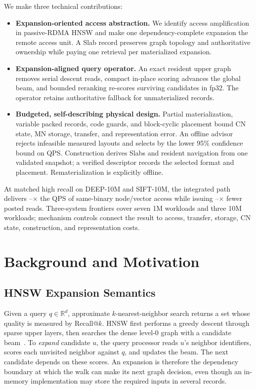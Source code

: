 \documentclass[sigconf,nonacm]{acmart}
\begin{document}
We make three technical contributions:
\begin{itemize}
  \item \textbf{Expansion-oriented access abstraction.}  We identify access
  amplification in passive-RDMA HNSW and make one dependency-complete expansion
  the remote access unit.  A Slab record preserves graph topology and
  authoritative ownership while paying one retrieval per materialized
  expansion.
  \item \textbf{Expansion-aligned query operator.}  An exact resident upper
  graph removes serial descent reads, compact in-place scoring advances the
  global beam, and bounded reranking re-scores surviving candidates in fp32.
  The operator retains authoritative fallback for unmaterialized records.
  \item \textbf{Budgeted, self-describing physical design.}  Partial materialization,
  variable packed records, code guards, and block-cyclic placement bound CN
  state, MN storage, transfer, and representation error.  An offline advisor
  rejects infeasible measured layouts and selects by the lower 95\% confidence
  bound on QPS.  Construction derives Slabs and resident navigation from one
  validated snapshot; a verified descriptor records the selected format and
  placement.  Rematerialization is explicitly offline.
\end{itemize}
At matched high recall on DEEP-10M and SIFT-10M, the integrated path delivers
\ClaimFrontierQpsMin--\ClaimFrontierQpsMax$\times$ the QPS of same-binary
node/vector access while issuing \ClaimFrontierPostsMin--\ClaimFrontierPostsMax$\times$
fewer posted reads.  Three-system frontiers cover seven 1M workloads and three
10M workloads; mechanism controls connect the result to access, transfer,
storage, CN state, construction, and representation costs.

\section{Background and Motivation}
\label{sec:diagnosis}

\subsection{HNSW Expansion Semantics}
\label{sec:bg-ann}

Given a query $q\in\mathbb{R}^d$, approximate $k$-nearest-neighbor search
returns a set whose quality is measured by Recall@$k$.  HNSW first performs a
greedy descent through sparse upper layers, then searches the dense level-0
graph with a candidate beam~\cite{hnsw}.  To \emph{expand} candidate $u$, the
query processor reads $u$'s neighbor identifiers, scores each unvisited
neighbor against $q$, and updates the beam.  The next candidate depends on
these scores.  An expansion is therefore the dependency boundary at which the
walk can make its next graph decision, even though an in-memory implementation
may store the required inputs in several records.
\end{document}
